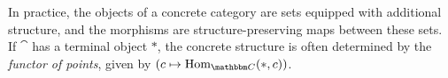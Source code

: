 \documentclass[a4paper,11pt,fleqn]{article}  %
\begin{document}
\begin{remark}\label{rem:concrete_terminal}
	In practice, the objects of a concrete category are sets equipped with additional structure, and the morphisms are structure-preserving maps between these sets.\\
	If $\cat$  has a terminal object $*$, the concrete structure is often determined by the \emph{functor of points}, given by $(c \mapsto \Hom_{\cat} (*, c))$.

\end{remark}

			
			
\end{document}
